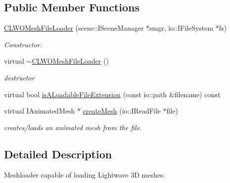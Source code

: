 \subsection*{Public Member Functions}
\begin{DoxyCompactItemize}
\item 
\hypertarget{classirr_1_1scene_1_1_c_l_w_o_mesh_file_loader_a446f39e0638b26ac5dde9f1cb8987e9c}{\hyperlink{classirr_1_1scene_1_1_c_l_w_o_mesh_file_loader_a446f39e0638b26ac5dde9f1cb8987e9c}{C\-L\-W\-O\-Mesh\-File\-Loader} (scene\-::\-I\-Scene\-Manager $\ast$smgr, io\-::\-I\-File\-System $\ast$fs)}\label{classirr_1_1scene_1_1_c_l_w_o_mesh_file_loader_a446f39e0638b26ac5dde9f1cb8987e9c}

\begin{DoxyCompactList}\small\item\em Constructor. \end{DoxyCompactList}\item 
\hypertarget{classirr_1_1scene_1_1_c_l_w_o_mesh_file_loader_a6d472a86e3aaa922daf04db9a071c2f2}{virtual \hyperlink{classirr_1_1scene_1_1_c_l_w_o_mesh_file_loader_a6d472a86e3aaa922daf04db9a071c2f2}{$\sim$\-C\-L\-W\-O\-Mesh\-File\-Loader} ()}\label{classirr_1_1scene_1_1_c_l_w_o_mesh_file_loader_a6d472a86e3aaa922daf04db9a071c2f2}

\begin{DoxyCompactList}\small\item\em destructor \end{DoxyCompactList}\item 
virtual bool \hyperlink{classirr_1_1scene_1_1_c_l_w_o_mesh_file_loader_a6c30c77ae517b9f08f5fc0e720e57523}{is\-A\-Loadable\-File\-Extension} (const io\-::path \&filename) const 
\item 
virtual I\-Animated\-Mesh $\ast$ \hyperlink{classirr_1_1scene_1_1_c_l_w_o_mesh_file_loader_a2756354f4690e8bc8c8e91fa299d5a21}{create\-Mesh} (io\-::\-I\-Read\-File $\ast$file)
\begin{DoxyCompactList}\small\item\em creates/loads an animated mesh from the file. \end{DoxyCompactList}\end{DoxyCompactItemize}


\subsection{Detailed Description}
Meshloader capable of loading Lightwave 3\-D meshes. 

